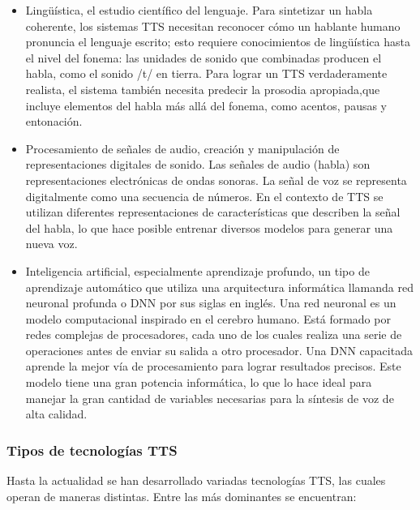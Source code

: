 \begin{itemize}
	\item Lingüística, el estudio científico del lenguaje. Para sintetizar un habla coherente, los sistemas TTS necesitan reconocer cómo un hablante humano pronuncia el lenguaje escrito; esto requiere conocimientos de lingüística hasta el nivel del fonema: las unidades de sonido que combinadas producen el habla, como el sonido /t/ en tierra. Para lograr un TTS verdaderamente realista, el sistema también necesita predecir la prosodia apropiada,que incluye elementos del habla más allá del fonema, como acentos, pausas y entonación.
	
	\item Procesamiento de señales de audio, creación y manipulación de representaciones digitales de sonido. Las señales de audio (habla) son representaciones electrónicas de ondas sonoras. La señal de voz se representa digitalmente como una secuencia de números. En el contexto de TTS se utilizan diferentes representaciones de características que describen la señal del habla, lo que hace posible entrenar diversos modelos para generar una nueva voz.
	
	\item Inteligencia artificial, especialmente aprendizaje profundo, un tipo de aprendizaje automático que utiliza una arquitectura informática llamanda red neuronal profunda o DNN por sus siglas en inglés. Una red neuronal es un modelo computacional inspirado en el cerebro humano. Está formado por redes complejas de procesadores, cada uno de los cuales realiza una serie de operaciones antes de enviar su salida a otro procesador. Una DNN capacitada aprende la mejor vía de procesamiento para lograr resultados precisos. Este modelo tiene una gran potencia informática, lo que lo hace ideal para manejar la gran cantidad de variables necesarias para la síntesis de voz de alta calidad.
\end{itemize}

\subsubsection*{Tipos de tecnologías TTS}

Hasta la actualidad se han desarrollado variadas tecnologías TTS, las cuales operan de maneras distintas. Entre las más dominantes se encuentran: 

